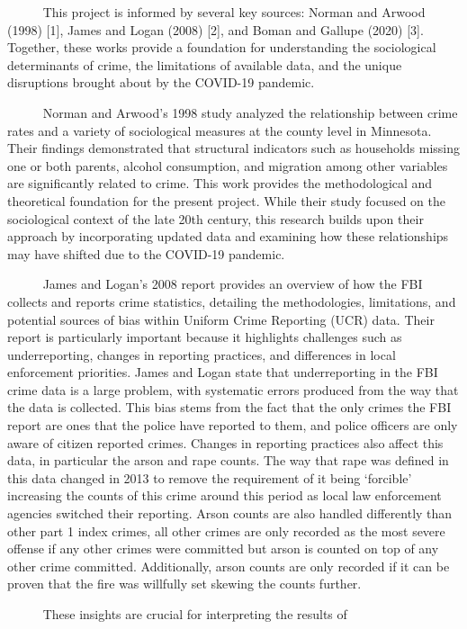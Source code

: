 \documentclass[
  11pt,
  letterpaper,
  DIV=11,
  numbers=noendperiod]{scrartcl}
\begin{document}
~~~~~ This project is informed by several key sources: Norman and Arwood
(1998) {[}1{]}, James and Logan (2008) {[}2{]}, and Boman and Gallupe
(2020) {[}3{]}. Together, these works provide a foundation for
understanding the sociological determinants of crime, the limitations of
available data, and the unique disruptions brought about by the COVID-19
pandemic.\\
\strut ~~~~~ Norman and Arwood's 1998 study analyzed the relationship
between crime rates and a variety of sociological measures at the county
level in Minnesota. Their findings demonstrated that structural
indicators such as households missing one or both parents, alcohol
consumption, and migration among other variables are significantly
related to crime. This work provides the methodological and theoretical
foundation for the present project. While their study focused on the
sociological context of the late 20th century, this research builds upon
their approach by incorporating updated data and examining how these
relationships may have shifted due to the COVID-19 pandemic.\\
\strut ~~~~~ James and Logan's 2008 report provides an overview of how
the FBI collects and reports crime statistics, detailing the
methodologies, limitations, and potential sources of bias within Uniform
Crime Reporting (UCR) data. Their report is particularly important
because it highlights challenges such as underreporting, changes in
reporting practices, and differences in local enforcement priorities.
James and Logan state that underreporting in the FBI crime data is a
large problem, with systematic errors produced from the way that the
data is collected. This bias stems from the fact that the only crimes
the FBI report are ones that the police have reported to them, and
police officers are only aware of citizen reported crimes. Changes in
reporting practices also affect this data, in particular the arson and
rape counts. The way that rape was defined in this data changed in 2013
to remove the requirement of it being `forcible' increasing the counts
of this crime around this period as local law enforcement agencies
switched their reporting. Arson counts are also handled differently than
other part 1 index crimes, all other crimes are only recorded as the
most severe offense if any other crimes were committed but arson is
counted on top of any other crime committed. Additionally, arson counts
are only recorded if it can be proven that the fire was willfully set
skewing the counts further.\\
\strut ~~~~~ These insights are crucial for interpreting the results of
\end{document}
